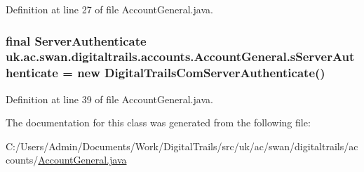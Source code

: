 Definition at line 27 of file Account\+General.\+java.

\hypertarget{classuk_1_1ac_1_1swan_1_1digitaltrails_1_1accounts_1_1_account_general_a9b2086712fd77bc10d704670f5245131}{
\subsubsection[{s\+Server\+Authenticate}]{\setlength{\rightskip}{0pt plus 5cm}final {\bf Server\+Authenticate} uk.\+ac.\+swan.\+digitaltrails.\+accounts.\+Account\+General.\+s\+Server\+Authenticate = new {\bf Digital\+Trails\+Com\+Server\+Authenticate}()\hspace{0.3cm}{\ttfamily [static]}}}\label{classuk_1_1ac_1_1swan_1_1digitaltrails_1_1accounts_1_1_account_general_a9b2086712fd77bc10d704670f5245131}


Definition at line 39 of file Account\+General.\+java.



The documentation for this class was generated from the following file\+:\begin{DoxyCompactItemize}
\item 
C\+:/\+Users/\+Admin/\+Documents/\+Work/\+Digital\+Trails/src/uk/ac/swan/digitaltrails/accounts/\hyperlink{_account_general_8java}{Account\+General.\+java}\end{DoxyCompactItemize}
